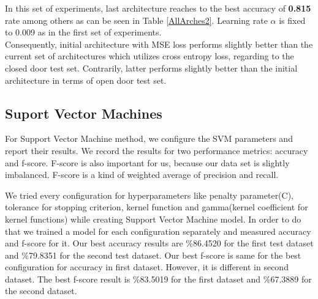 \documentclass[conference]{IEEEtran}
\begin{document}
In this set of experiments, last architecture reaches to the best accuracy of \textbf{0.815 }rate among others as can be seen in Table \ref{AllArches2}. Learning rate $\alpha$ is fixed to 0.009 as in the first set of experiments.\\
 
Consequently, initial architecture with MSE loss performs slightly better than the current set of architectures which utilizes cross entropy loss, regarding to the closed door test set. Contrarily, latter performs slightly better than the initial architecture in terms of open door test set. 
\subsection{Suport Vector Machines}
For Support Vector Machine method, we configure the SVM parameters and report their results. We record the results for two performance metrics: accuracy and f-score. F-score is also important for us, because our data set is slightly imbalanced. F-score is a kind of weighted average of precision and recall.

We tried every configuration for hyperparameters like penalty parameter(C), tolerance for stopping criterion, kernel function and gamma(kernel coefficient for kernel functions) while creating Support Vector Machine model. In order to do that we trained a model for each configuration separately and measured accuracy and f-score for it. Our best accuracy results are \%86.4520 for the first test dataset and \%79.8351 for the second test dataset. Our best f-score is same for the best configuration for accuracy in first dataset. However, it is different in second dataset. The best f-score result is \%83.5019 for the first dataset and \%67.3889 for the second dataset.
\end{document}
